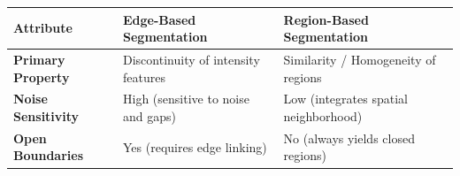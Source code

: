 \documentclass[12pt,a4paper]{article}
\renewcommand{\arraystretch}{1.45}
\begin{document}
\begin{tcolorbox}[tikzbox, title={Edge-Based vs. Region-Based Segmentation}]
\centering
{\renewcommand{\arraystretch}{1.55}%
\begin{tabularx}{\linewidth}{|>{\bfseries}B{3.2cm}|Y|Y|}
\hline
Attribute & Edge-Based Segmentation & Region-Based Segmentation \\
\hline
Primary Property & Discontinuity of intensity features & Similarity / Homogeneity of regions \\
\hline
Noise Sensitivity & High (sensitive to noise and gaps) & Low (integrates spatial neighborhood) \\
\hline
Open Boundaries & Yes (requires edge linking) & No (always yields closed regions) \\
\hline
\end{tabularx}}
\end{tcolorbox}
\end{document}

